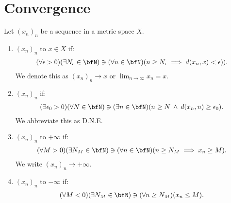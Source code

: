 \section{Convergence}
    \begin{definition}
        Let $(x_n)_n$ be a sequence in a metric space $X$.
        \begin{enumerate}[label = (\arabic*)]
            \item $(x_n)_n$  to $x \in X$ if:
                \begin{equation*}
                \begin{split}
                    (\forall \epsilon > 0)(\exists N_\epsilon \in \bfN)\ni(\forall n \in \bfN)(n \geq N_\epsilon \implies d(x_n,x) < \epsilon)).
                \end{split}
                \end{equation*}
            We denote this as $(x_n)_n \rightarrow x$ or $\lim_{n \rightarrow \infty} x_n = x$.

            \item $(x_n)_n$  if:
                \begin{equation*}
                \begin{split}
                    (\exists \epsilon_0 > 0)(\forall N \in \bfN)\ni (\exists n \in \bfN)(n \geq N \hspace{2pt}\wedge\hspace{2pt} d(x_n,n)\geq \epsilon_0).
                \end{split}
                \end{equation*}
            We abbreviate this as D.N.E.

            \item $(x_n)_n$  to $+\infty$ if:
                \begin{equation*}
                \begin{split}
                    (\forall M > 0)(\exists N_M \in \bfN) \ni (\forall n \in \bfN)(n \geq N_M \implies x_n \geq M).
                \end{split}
                \end{equation*}
            We write $(x_n)_n \rightarrow +\infty$.

            \item $(x_n)_n$  to $-\infty$ if:
                \begin{equation*}
                \begin{split}
                    (\forall M < 0)(\exists N_M \in \bfN) \ni (\forall n \geq N_M)(x_n \leq M).
                \end{split}
                \end{equation*}
        \end{enumerate}      
    \end{definition} 

